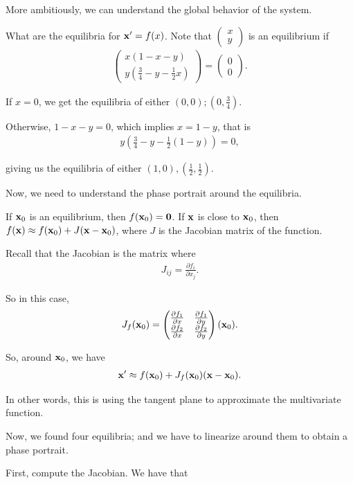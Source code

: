 \documentclass{article}
\newcommand{\mat}[1]{\begin{pmatrix}#1\end{pmatrix}}
\begin{document}
More ambitiously, we can understand the global behavior of the system.

What are the equilibria for $\mathbf{x} ' = f(x)$.  Note that $\mat{x \\ y}$ is an equilibrium if
\begin{align*}
  \mat{x(1 - x - y) \\ y (\frac{3}{4} - y - \frac{1}{2}x)} = \mat{0 \\ 0}.
\end{align*}

If $x = 0$, we get the equilibria of either $(0, 0); (0, \frac{3}{4})$.

Otherwise, $1 - x - y = 0$, which implies $x = 1-y$, that is
\begin{align*}
  y (\frac{3}{4} - y - \frac{1}{2} ( 1 - y)) = 0,
\end{align*}

giving us the equilibria of either $(1, 0), (\frac{1}{2}, \frac{1}{2})$.

Now, we need to understand the phase portrait around the equilibria.

If $\mathbf{x}_0$ is an equilibrium, then $f(\mathbf{x}_0) = \mathbf{0}$.  If $\mathbf{x}$ is close to $\mathbf{x}_0$, then $f(\mathbf{x}) \approx f(\mathbf{x}_0) + J( \mathbf{x} - \mathbf{x}_0 )$, where $J$ is the Jacobian matrix of the function.

Recall that the Jacobian is the matrix where
\begin{align*}
  J_{ij} = \frac{\partial f_i}{\partial x_j}.
\end{align*}

So in this case,
\begin{align*}
  J_f(\mbf{x}_0) = \mat{\frac{\partial f_1}{\partial x} & \frac{\partial f_1}{\partial y} \\ \frac{\partial f_2}{\partial x} & \frac{\partial f_2}{\partial y}}(\mbf{x}_0).
\end{align*}

So, around $\mathbf{x}_0$, we have
\begin{align*}
  \mathbf{x}' \approx f(\mathbf{x}_0) + J_f(\mathbf{x}_0) (\mathbf{x} - \mathbf{x}_0).
\end{align*}

In other words, this is using the tangent plane to approximate the multivariate function.

Now, we found four equilibria; and we have to linearize around them to obtain a phase portrait.

First, compute the Jacobian.  We have that
\end{document}
